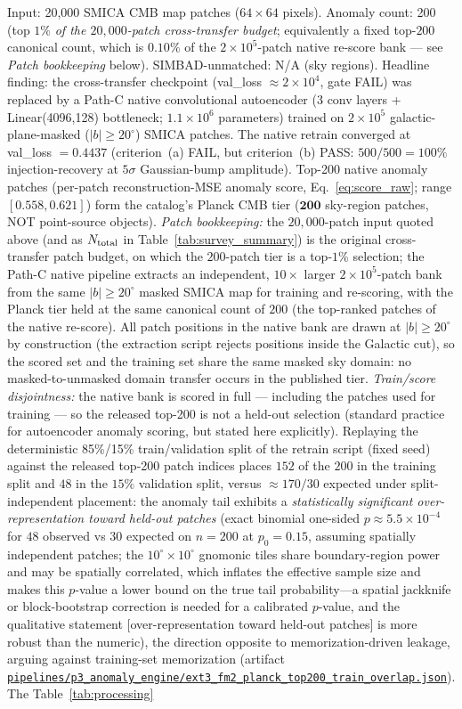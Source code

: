 \documentclass[aps,prd,twocolumn,superscriptaddress,showpacs,preprintnumbers,nofootinbib,longbibliography,floatfix]{revtex4-2}
\newcommand{\repoBase}{https://github.com/Hubify-Projects/bigbounce/blob/main}
\newcommand{\artifact}[1]{\href{\repoBase/#1}{\nolinkurl{#1}}}
\begin{document}
Input: 20{,}000 SMICA CMB map patches ($64\!\times\!64$ pixels). Anomaly count: 200 (top $1\%$ \emph{of the $20{,}000$-patch cross-transfer budget}; equivalently a fixed top-$200$ canonical count, which is $0.10\%$ of the $2\times10^5$-patch native re-score bank --- see \emph{Patch bookkeeping} below). SIMBAD-unmatched: N/A (sky regions). Headline finding: the cross-transfer checkpoint (val\_loss $\approx 2\!\times\!10^4$, gate FAIL) was replaced by a Path-C native convolutional autoencoder ($3$ conv layers + Linear(4096,128) bottleneck; $1.1\!\times\!10^6$ parameters) trained on $2\!\times\!10^5$ galactic-plane-masked ($|b|\geq 20^\circ$) SMICA patches. The native retrain converged at val\_loss $= 0.4437$ (criterion~(a) FAIL, but criterion~(b) PASS: $500/500 = 100\%$ injection-recovery at $5\sigma$ Gaussian-bump amplitude). Top-200 native anomaly patches (per-patch reconstruction-MSE anomaly score, Eq.~\ref{eq:score_raw}; range $[0.558, 0.621]$) form the catalog's Planck CMB tier ($\mathbf{200}$ sky-region patches, NOT point-source objects). \emph{Patch bookkeeping:} the $20{,}000$-patch input quoted above (and as $N_{\rm total}$ in Table~\ref{tab:survey_summary}) is the original cross-transfer patch budget, on which the $200$-patch tier is a top-$1\%$ selection; the Path-C native pipeline extracts an independent, $10\times$ larger $2\times10^{5}$-patch bank from the same $|b|\geq 20^\circ$ masked SMICA map for training and re-scoring, with the Planck tier held at the same canonical count of $200$ (the top-ranked patches of the native re-score). All patch positions in the native bank are drawn at $|b| \geq 20^\circ$ by construction (the extraction script rejects positions inside the Galactic cut), so the scored set and the training set share the same masked sky domain: no masked-to-unmasked domain transfer occurs in the published tier. \emph{Train/score disjointness:} the native bank is scored in full --- including the patches used for training --- so the released top-200 is not a held-out selection (standard practice for autoencoder anomaly scoring, but stated here explicitly). Replaying the deterministic 85\%/15\% train/validation split of the retrain script (fixed seed) against the released top-200 patch indices places $152$ of the $200$ in the training split and $48$ in the $15\%$ validation split, versus ${\approx}170/30$ expected under split-independent placement: the anomaly tail exhibits a \emph{statistically significant over-representation toward held-out patches} (exact binomial one-sided $p \approx 5.5\times10^{-4}$ for $48$ observed vs $30$ expected on $n=200$ at $p_0=0.15$, assuming spatially independent patches; the $10^\circ\!\times\!10^\circ$ gnomonic tiles share boundary-region power and may be spatially correlated, which inflates the effective sample size and makes this $p$-value a lower bound on the true tail probability---a spatial jackknife or block-bootstrap correction is needed for a calibrated $p$-value, and the qualitative statement [over-representation toward held-out patches] is more robust than the numeric), the direction opposite to memorization-driven leakage, arguing against training-set memorization (artifact \artifact{pipelines/p3\_anomaly\_engine/ext3\_fm2\_planck\_top200\_train\_overlap.json}). The Table~\ref{tab:processing} 
\end{document}
